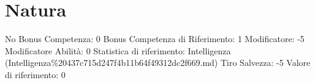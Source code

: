 \section{Natura}\label{natura}

\begin{description}
\tightlist
\item[Tags: ABI]
No Bonus Competenza: 0 Bonus Competenza di Riferimento: 1 Modificatore:
-5 Modificatore Abilità: 0 Statistica di riferimento: Intelligenza
(Intelligenza\%20437c715d247f4b11b64f49312dc2f669.md) Tiro Salvezza: -5
Valore di riferimento: 0
\end{description}
